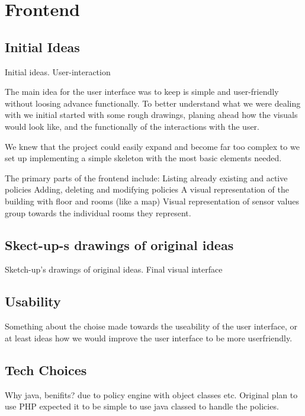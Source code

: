 \section{Frontend}
\subsection{Initial Ideas}
Initial ideas. User-interaction

The main idea for the user interface was to keep is simple and user-friendly without loosing advance functionally. To better understand what we were dealing with we initial started with some rough drawings, planing ahead how the visuals would look like, and the functionally of the interactions with the user.

We knew that the project could easily expand and become far too complex to we set up implementing a simple skeleton with the most basic elements needed.

The primary parts of the frontend include:
Listing already existing and active policies
Adding, deleting and modifying policies
A visual representation of the building with floor and rooms (like a map)
Visual representation of sensor values group towards the individual rooms they represent.

\subsection{Skect-up-s drawings of original ideas}

	Sketch-up's drawings of original ideas.
	Final visual interface
	

\subsection{Usability}
Something about the choise made towards the useability of the user interface, or at least ideas how we would improve the user interface to be more userfriendly.


\subsection{Tech Choices}
Why java, benifits? due to policy engine with object classes etc. Original plan to use PHP expected it to be simple to use java classed to handle the policies.
